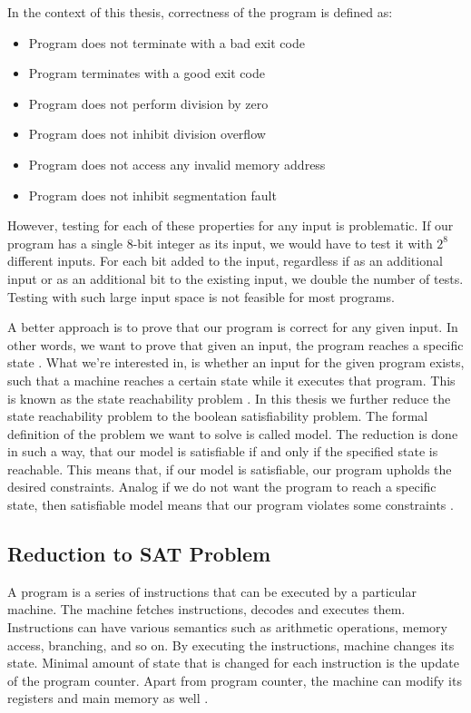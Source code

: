 \documentclass[12pt]{article}
\begin{document}
In the context of this thesis, correctness of the program is defined as:

\begin{itemize}
    \item Program does not terminate with a bad exit code
    \item Program terminates with a good exit code
    \item Program does not perform division by zero
    \item Program does not inhibit division overflow
    \item Program does not access any invalid memory address
    \item Program does not inhibit segmentation fault
\end{itemize}

However, testing for each of these properties for any input is problematic. If
our program has a single 8-bit integer as its input, we would have to test it 
with $2^{8}$ different inputs. For each bit added to the input, regardless
if as an additional input or as an additional bit to the existing input, we
double the number of tests. Testing with such large input space is not feasible
for most programs.

A better approach is to prove that our program is correct for any given input.
In other words, we want to prove that given an input, the program reaches a
specific state \cite{dunlop1982comparative}. What we're interested in, is
whether an input for the given program exists, such that a machine reaches a
certain state while it executes that program. This is known as the state
reachability problem \cite{abdulla2000symbolic}. In this thesis we further
reduce the state reachability problem to the boolean satisfiability problem.
The formal definition of the problem we want to solve is called model. The
reduction is done in such a way, that our model is satisfiable if and only if
the specified state is reachable. This means that, if our model is satisfiable,
our program upholds the desired constraints. Analog if we do not want the
program to reach a specific state, then satisfiable model means that our
program violates some constraints \cite{brummayer2008btor}.

\subsection{Reduction to SAT Problem}

A program is a series of instructions that can be executed by a particular
machine. The machine fetches instructions, decodes  and executes them.
Instructions can have various semantics such as arithmetic operations, memory
access, branching, and so on. By executing the instructions, machine changes
its state. Minimal amount of state that is changed for each instruction is the
update of the program counter. Apart from program counter, the machine can
modify its registers and main memory as well \cite{flynn2007computer}.
\end{document}
